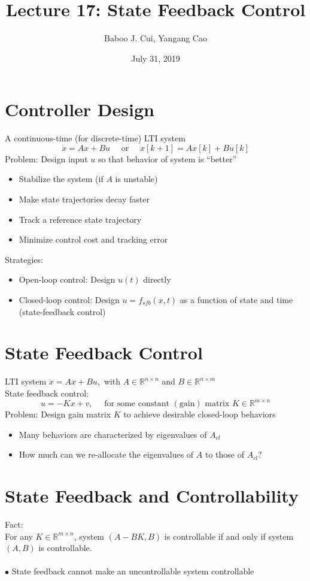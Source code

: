 \documentclass[10pt,a4paper,oneside]{article}
\date{July 31, 2019}
\author{Baboo J. Cui, Yangang Cao}
\title{Lecture 17: State Feedback Control}
\begin{document}
\maketitle
\tableofcontents
\newpage
\section{Controller Design}
A continuous-time (for discrete-time) LTI system
\[
\dot{x}=A x+B u \quad \text { or } \quad x[k+1]=A x[k]+B u[k]
\]
Problem: Design input $u$ so that behavior of system is ``better''
\begin{itemize}
\item Stabilize the system (if $A$ is unstable)
\item Make state trajectories decay faster
\item Track a reference state trajectory
\item Minimize control cost and tracking error
\end{itemize}
Strategies:
\begin{itemize}
\item Open-loop control: Design $u(t)$ directly
\item Closed-loop control: Design $u=f_{sfb}(x,t)$ as a function of state and time (state-feedback control)
\end{itemize}
\section{State Feedback Control}
LTI system $\dot{x}=A x+B u,$ with $A \in \mathbb{R}^{n \times n}$ and $B \in \mathbb{R}^{n \times m}$\\
State feedback control:\\
\[
u=-Kx+v, \quad \text { for some constant }(\text {gain}) \text { matrix } K \in \mathbb{R}^{m \times n}
\]
Problem: Design gain matrix $K$ to achieve desirable closed-loop behaviors
\begin{itemize}
\item Many behaviors are characterized by eigenvalues of $A_{cl}$
\item How much can we re-allocate the eigenvalues of $A$ to those of $A_{cl} ?$
\end{itemize}
\section{State Feedback and Controllability}
Fact:\\
For any $K\in\mathbb{R}^{m\times n}$, system $(A-BK,B)$ is controllable if and only if system $(A,B)$ is controllable.\\
\\$\bullet$ State feedback cannot make an uncontrollable system controllable
\end{document}
